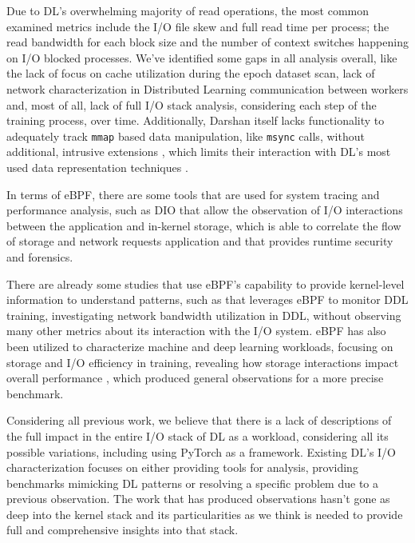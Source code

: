 \documentclass[conference]{IEEEtran}
\begin{document}
Due to DL's overwhelming majority of read operations, the most common examined metrics include the I/O file skew and full read time per process; the read bandwidth for each block size and the number of context switches happening on I/O blocked processes. We've identified some gaps in all analysis overall, like the lack of focus on cache utilization during the epoch dataset scan, lack of network characterization in Distributed Learning communication between workers and, most of all, lack of full I/O stack analysis, considering each step of the training process, over time. Additionally, Darshan itself lacks functionality to adequately track \texttt{mmap} based data manipulation, like \texttt{msync} calls, without additional, intrusive extensions \cite{tfdarshan}, which limits their interaction with DL's most used data representation techniques \cite{LMDB}.

In terms of eBPF, there are some tools that are used for system tracing and performance analysis,
such as DIO \cite{DIO} that allow the observation of I/O interactions between the application and in-kernel storage,
\cite{CAT} which is able to correlate the flow of storage and network requests application and \cite{tracee} that provides runtime security and forensics.

There are already some studies that use eBPF's capability to provide kernel-level information to understand patterns, such as \cite{eBPFDLNetwork} that
leverages eBPF to monitor DDL training, investigating network bandwidth utilization in DDL, without observing many other metrics about its interaction with the I/O system.
eBPF has also been utilized to characterize machine and deep learning workloads, focusing on storage and I/O efficiency in training,
revealing how storage interactions impact overall performance \cite{OanaDL, OanaML}, which produced general observations for a more precise benchmark.

Considering all previous work, we believe that there is a lack of descriptions of the full impact in the entire I/O stack of DL as a workload, considering all its possible variations, including using PyTorch as a framework. Existing DL's I/O characterization focuses on either providing tools for analysis, providing benchmarks mimicking DL patterns or resolving a specific problem due to a previous observation. The work that has produced observations hasn't gone as deep into the kernel stack and its particularities as we think is needed to provide full and comprehensive insights into that stack. 
\end{document}
